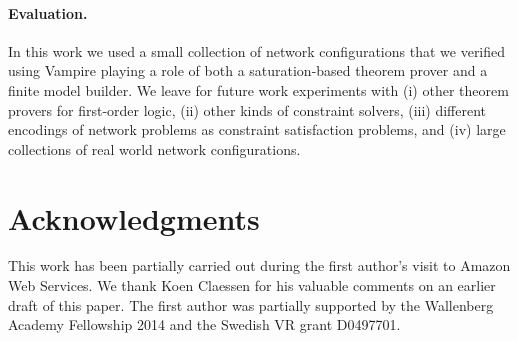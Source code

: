 \paragraph{Evaluation.} In this work we used a small collection of network configurations that we verified using Vampire playing a role of both a saturation-based theorem prover and a finite model builder. We leave for future work experiments with (i) other theorem provers for first-order logic, (ii) other kinds of constraint solvers, (iii) different encodings of network problems as constraint satisfaction problems, and (iv) large collections of real world network configurations.

\section*{Acknowledgments}
\label{sect:aws/acks}
This work has been partially carried out during the first author's visit to Amazon Web Services. We thank Koen Claessen for his valuable comments on an earlier draft of this paper. The first author was partially supported by the Wallenberg Academy Fellowship 2014 and the Swedish VR grant D0497701.
